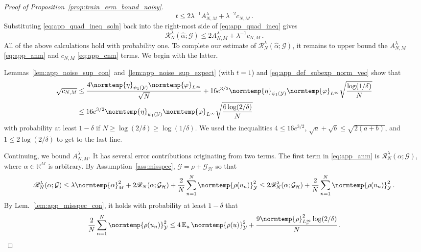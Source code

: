 \documentclass{article}
\theoremstyle{plain}
\theoremstyle{my_def}
\theoremstyle{my_rem}
\numberwithin{equation}{section}
\numberwithin{theorem}{section}%
\newcommand{\R}{\mathbb{R}}
\newcommand{\E}{\mathbb{E}}
\newcommand{\scrR}{\mathscr{R}}
\newcommand{\cG}{\mathcal{G}}
\newcommand{\cH}{\mathcal{H}}
\newcommand{\cY}{\mathcal{Y}}
\newcommand{\norm}{\normtemp}
\renewcommand{\hat}{\widehat}
\renewcommand{\E}{\operatorname{\mathbb{E}}} %
\newcommand{\al}{\alpha}
\newcommand{\GH}{\cG_{\cH}}
\renewcommand{\phi}{\varphi}
\begin{document}
\begin{proof}[Proof of Proposition~\ref{prop:train_erm_bound_noisy}]
    \begin{equation}\label{eq:app_quad_ineq_soln}
        t \le 2\lambda^{-1} A_{N,M}^\lambda + \lambda^{-2} c_{N,M}\,.
    \end{equation}
    Substituting \eqref{eq:app_quad_ineq_soln} back into the right-most side of \eqref{eq:app_quad_ineq} gives
    \begin{equation}\label{eq:app_quad_ineq_risk}
        \scrR_N^\lambda(\hat{\alpha};\cG) \le 2A_{N,M}^\lambda + \lambda^{-1} c_{N,M}\,.
    \end{equation}
    All of the above calculations hold with probability one. To complete our estimate of $\scrR_N^\lambda(\hat{\alpha};\cG)$, it remains to upper bound the $A_{N,M}^\lambda$ \eqref{eq:app_anm} and $c_{N,M}$ \eqref{eq:app_cnm} terms. We begin with the latter.
    
    Lemmas~\ref{lem:app_noise_sup_con}~and~\ref{lem:app_noise_sup_expect} (with $t=1$) and \eqref{eq:app_def_subexp_norm_vec} show that
    \begin{align}\label{eq:app_cnm_bound}
        \begin{split}
        \sqrt{c_{N,M}}&\leq \frac{4\norm{\eta}_{\psi_1(\cY)}\norm{\phi}_{L^\infty}}{\sqrt{N}}
        + 16e^{3/2}\norm{\eta}_{\psi_1(\cY)}\norm{\phi}_{L^\infty}\sqrt{\frac{\log(1/\delta)}{N}}\\
        &\leq 16e^{3/2}\norm{\eta}_{\psi_1(\cY)}\norm{\phi}_{L^\infty}\sqrt{\frac{6\log(2/\delta)}{N}}
        \end{split}
    \end{align}
    with probability at least $1-\delta$ if $N\geq \log(2/\delta)\geq \log(1/\delta)$. We used the inequalities $4\leq 16e^{3/2}$, $\sqrt{a}+\sqrt{b}\leq \sqrt{2(a+b)}$, and $1\leq 2\log(2/\delta)$ to get to the last line.

    Continuing, we bound $A_{N,M}^\lambda$. It has several error contributions originating from two terms. The first term in \eqref{eq:app_anm} is $\scrR_N^\lambda(\alpha;\cG)$, where $\al\in\R^M$ is arbitrary. By Assumption~\ref{ass:misspec}, $\cG=\rho+\GH$ so that
    \begin{equation}\label{eq:approx_decomp}
        \scrR_N^\lambda(\alpha;\cG)\leq \lambda\norm{\al}_M^2 + 2\scrR_N(\alpha;\GH) + \frac{2}{N}\sum_{n=1}^N\norm{\rho(u_n)}_\cY^2\leq 2\scrR_N^\lambda(\alpha;\GH) + \frac{2}{N}\sum_{n=1}^N\norm{\rho(u_n)}_\cY^2\,.
    \end{equation}
    By Lem.~\ref{lem:app_misspec_con}, it holds with probability at least $1-\delta$ that
    \begin{equation}\label{eq:app_misspec_con}
        \frac{2}{N}\sum_{n=1}^N\norm{\rho(u_n)}_\cY^2 \leq 4 \E_u \norm{\rho(u)}_{\cY}^2 + \frac{9\norm{\rho}_{L^\infty_\nu}^2\log(2/\delta)}{N}\,.
    \end{equation}


\end{proof}
\end{document}
